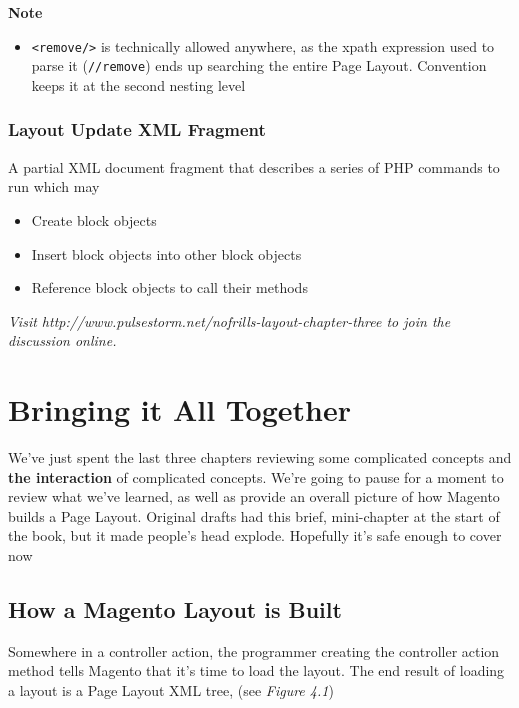 \documentclass[oneside]{book}
\begin{document}
\textbf{Note}

\begin{itemize}
\item \footnotesize\texttt{\textless remove/\textgreater } \normalsize  is technically allowed anywhere, as the xpath expression used to parse it (\footnotesize\texttt{//remove}\normalsize) ends up searching the entire Page Layout.  Convention keeps it at the second nesting level
\end{itemize}


\subsection{Layout Update XML Fragment}

A partial XML document fragment that describes a series of PHP commands to run which may

\begin{itemize}
\item Create block objects
\item Insert block objects into other block objects
\item Reference block objects to call their methods
\end{itemize}


\emph{Visit http://www.pulsestorm.net/nofrills-layout-chapter-three to join the discussion online.}    
\chapter{Bringing it All Together}
We've just spent the last three chapters reviewing some complicated concepts and \textbf{the interaction} of complicated concepts.  We're going to pause for a moment to review what we've learned, as well as provide an overall picture of how Magento builds a Page Layout.  Original drafts had this brief, mini-chapter at the start of the book, but it made people's head explode.  Hopefully it's safe enough to cover now

\section{How a Magento Layout is Built}

Somewhere in a controller action, the programmer creating the controller action method tells Magento that it's time to load the layout.  The end result of loading a layout is a Page Layout XML tree, (see \emph{Figure 4.1})
\end{document}
